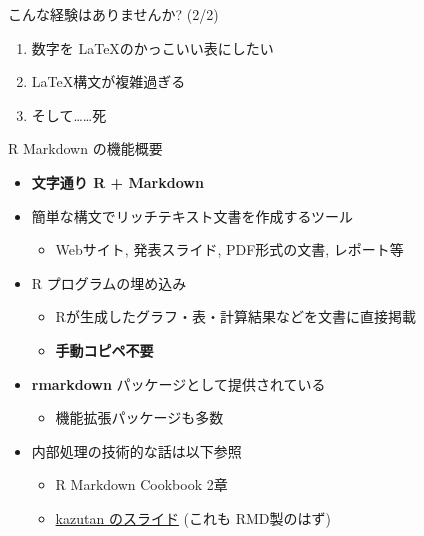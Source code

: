 \documentclass[
  ignorenonframetext,
]{beamer}
\providecommand{\tightlist}{%
  \setlength{\itemsep}{0pt}\setlength{\parskip}{0pt}}
\begin{document}
\begin{frame}{こんな経験はありませんか? (2/2)}
\protect\hypertarget{ux3053ux3093ux306aux7d4cux9a13ux306fux3042ux308aux307eux305bux3093ux304b-22}{}
\begin{enumerate}
\tightlist
\item
  数字を \LaTeX のかっこいい表にしたい
\item
  \LaTeX 構文が複雑過ぎる
\item
  そして\ldots\ldots 死
\end{enumerate}
\end{frame}

\begin{frame}{R Markdown の機能概要}
\protect\hypertarget{r-markdown-ux306eux6a5fux80fdux6982ux8981}{}
\begin{itemize}
\item
  \textbf{文字通り R + Markdown}
\item
  簡単な構文でリッチテキスト文書を作成するツール

  \begin{itemize}
  \tightlist
  \item
    Webサイト, 発表スライド, PDF形式の文書, レポート等
  \end{itemize}
\item
  R プログラムの埋め込み

  \begin{itemize}
  \tightlist
  \item
    Rが生成したグラフ・表・計算結果などを文書に直接掲載
  \item
    \textbf{手動コピペ不要}
  \end{itemize}
\item
  \textbf{rmarkdown} パッケージとして提供されている

  \begin{itemize}
  \tightlist
  \item
    機能拡張パッケージも多数
  \end{itemize}
\item
  内部処理の技術的な話は以下参照

  \begin{itemize}
  \tightlist
  \item
    R Markdown Cookbook 2章
  \item
    \href{https://kazutan.github.io/HijiyamaR6/intoTheRmarkdown.html\#/}{kazutan のスライド} (これも RMD製のはず)
  \end{itemize}
\end{itemize}
\end{frame}
\end{document}
